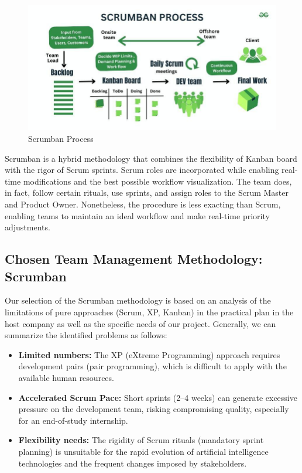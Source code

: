 \begin{center}
\begin{figure}[H]
            \centering
            \includegraphics[scale=0.44]{images/scrumban.jpg}
            \caption{Scrumban Process }
            \label{fig:Scrumban_Process}
\end{figure}
\end{center}

Scrumban is a hybrid methodology that combines the flexibility of Kanban board with the rigor of Scrum sprints. Scrum roles are incorporated while enabling real-time modifications and the best possible workflow visualization. The team does, in fact, follow certain rituals, use sprints, and assign roles to the Scrum Master and Product Owner. Nonetheless, the procedure is less exacting than Scrum, enabling teams to maintain an ideal workflow and make real-time priority adjustments.
   


\subsection{Chosen Team Management Methodology: Scrumban}
Our selection of the Scrumban methodology is based on an analysis of the limitations of pure approaches (Scrum, XP, Kanban) in the practical plan in the host company as well as the specific needs of our project. Generally, we can summarize the identified problems as follows:
\begin{itemize}
    \item \textbf{Limited numbers:}
    The XP (eXtreme Programming) approach requires development pairs (pair programming), which is difficult to apply with the available human resources.
        
    \item \textbf{Accelerated Scrum Pace:}
    Short sprints (2–4 weeks) can generate excessive pressure on the development team, risking compromising quality, especially for an end-of-study internship.    
        
    \item \textbf{Flexibility needs:}
    The rigidity of Scrum rituals (mandatory sprint planning) is unsuitable for the rapid evolution of artificial intelligence technologies and the frequent changes imposed by stakeholders.
    \end{itemize}
    
